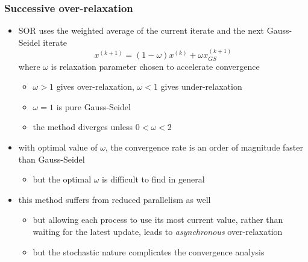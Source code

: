 \begin{frame}[fragile]
%
  \frametitle{Successive over-relaxation}
%
  \begin{itemize}
%
  \item SOR uses the weighted average of the current iterate and the next Gauss-Seidel iterate
    \begin{equation}
      x^{(k+1)} = (1-\omega) x^{(k)} + \omega x^{(k+1)}_{GS}
    \end{equation}
%
    where $\omega$ is relaxation parameter chosen to accelerate convergence
    \begin{itemize}
    \item $\omega > 1$ gives over-relaxation, $\omega < 1$ gives under-relaxation
    \item $\omega = 1$ is pure Gauss-Seidel
    \item the method diverges unless $0 < \omega < 2$
    \end{itemize}
%
  \item with  optimal value of $\omega$, the convergence rate is an order of magnitude faster
    than Gauss-Seidel
    \begin{itemize}
    \item but the optimal $\omega$ is difficult to find in general
    \end{itemize}
%
  \item this method suffers from reduced parallelism as well
    \begin{itemize}
    \item but allowing each process to use its most current value, rather than waiting for the
      latest update, leads to {\em asynchronous} over-relaxation
    \item but the stochastic nature complicates the convergence analysis
    \end{itemize}
%
  \end{itemize}
%
\end{frame}

